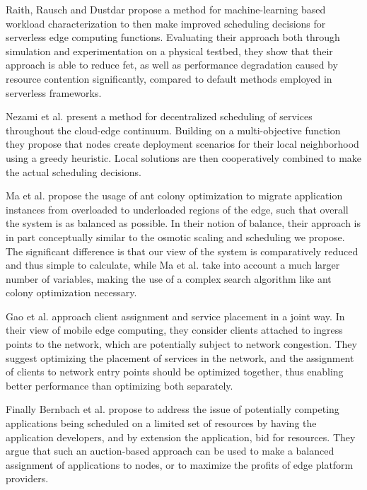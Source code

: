 \documentclass[draft,final]{vutinfth} %
\begin{document}
Raith, Rausch and Dustdar\cite{philipp-da} propose a method for machine-learning based workload characterization to then make improved scheduling decisions for serverless edge computing functions.
Evaluating their approach both through simulation and experimentation on a physical testbed, they show that their approach is able to reduce \gls{fet}, as well as performance degradation caused by resource contention significantly, compared to default methods employed in serverless frameworks\cite{philipp-da}.

Nezami et al.\cite{nezamiDecentralizedEdgetoCloudLoad2021} present a method for decentralized scheduling of services throughout the cloud-edge continuum.
Building on a multi-objective function they propose that nodes create deployment scenarios for their local neighborhood using a greedy heuristic.
Local solutions are then cooperatively combined to make the actual scheduling decisions.

Ma et al.\cite{maContainerMigrationMechanism2020} propose the usage of ant colony optimization to migrate application instances from overloaded to underloaded regions of the edge, such that overall the system is as balanced as possible.
In their notion of balance, their approach is in part conceptually similar to the osmotic scaling and scheduling we propose.
The significant difference is that our view of the system is comparatively reduced and thus simple to calculate, while Ma et al. take into account a much larger number of variables, making the use of a complex search algorithm like ant colony optimization necessary.

Gao et al.\cite{gaoWinningStartingLine2019} approach client assignment and service placement in a joint way.
In their view of mobile edge computing, they consider clients attached to ingress points to the network, which are potentially subject to network congestion.
They suggest optimizing the placement of services in the network, and the assignment of clients to network entry points should be optimized together, thus enabling better performance than optimizing both separately.

Finally Bernbach et al.\cite{beraldiCooperativeLoadBalancing2017} propose to address the issue of potentially competing applications being scheduled on a limited set of resources by having the application developers, and by extension the application, bid for resources.
They argue that such an auction-based approach can be used to make a balanced assignment of applications to nodes, or to maximize the profits of edge platform providers.
\end{document}
